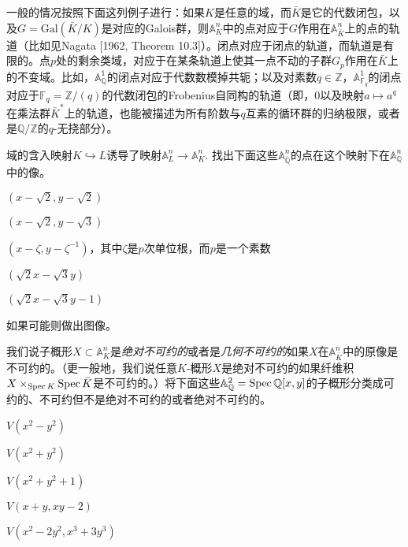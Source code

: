 一般的情况按照下面这列例子进行：如果$K$是任意的域，而$\bar K$是它的代数闭包，以及$G=\mathrm{Gal}(\bar K/K)$是对应的Galois群，则$\mathbb{A}_{K}^n$中的点对应于$G$作用在$\mathbb{A}_{\bar K}^n$上的点的轨道（比如见Nagata [1962, Theorem 10.3]）。闭点对应于闭点的轨道，而轨道是有限的。点$p$处的剩余类域，对应于在某条轨道上使其一点不动的子群$G_p$作用在$\bar K$上的不变域。比如，$\mathbb{A}^1_\mathbb{Q}$的闭点对应于代数数模掉共轭；以及对素数$q\in \mathbb{Z}$，$\mathbb{A}_{\mathbb{F}_q}^1$的闭点对应于$\mathbb{F}_q=\mathbb{Z}/(q)$的代数闭包的Frobenius自同构的轨道（即，$0$以及映射$a\mapsto a^q$在乘法群$\bar K^*$上的轨道，也能被描述为所有阶数与$q$互素的循环群的归纳极限，或者是$\mathbb{Q}/\mathbb{Z}$的$q$-无挠部分）。

\begin{exe}
	域的含入映射$K\hookrightarrow L$诱导了映射$\mathbb{A}_L^n\to \mathbb{A}_K^n$. 找出下面这些$\mathbb{A}_{\overline{\mathbb{Q}}}^n$的点在这个映射下在$\mathbb{A}_{\mathbb{Q}}^n$中的像。
	\begin{compactenum}[(a)]
		\item $(x-\sqrt{2},y-\sqrt{2})$
		\item $(x-\sqrt{2},y-\sqrt{3})$
		\item $(x-\zeta,y-\zeta^{-1})$，其中$\zeta$是$p$次单位根，而$p$是一个素数
		\item $(\sqrt{2}x-\sqrt{3}y)$
		\item $(\sqrt{2}x-\sqrt{3}y-1)$
	\end{compactenum}
	如果可能则做出图像。
\end{exe}

\begin{exe}
	我们说子概形$X\subset \mathbb{A}_K^n$是\textit{绝对不可约的}或者是\textit{几何不可约的}如果$X$在$\mathbb{A}_{\bar K}^n$中的原像是不可约的。（更一般地，我们说任意$K$\hyp 概形$X$是绝对不可约的如果纤维积$X\times_{\operatorname{Spec} K}\operatorname{Spec} \bar{K}$是不可约的。）将下面这些$\mathbb{A}_\mathbb{Q}^2=\operatorname{Spec} \mathbb{Q}[x,y]$的子概形分类成可约的、不可约但不是绝对不可约的或者绝对不可约的。
	\begin{compactenum}[(a)]
		\item $V(x^2-y^2)$
		\item $V(x^2+y^2)$
		\item $V(x^2+y^2+1)$
		\item $V(x+y,xy-2)$
		\item $V(x^2-2y^2,x^3+3y^3)$
	\end{compactenum}
\end{exe}

